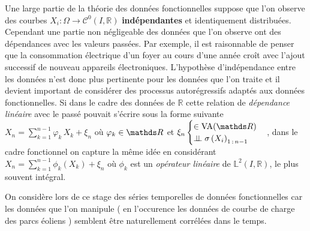 Une large partie de la théorie des données fonctionnelles suppose que l'on observe des courbes $X_i : \Omega \rightarrow \mathcal C^0(I, \mathds R)$ \textbf{indépendantes} et identiquement distribuées. Cependant une partie non négligeable des données que l'on observe ont des dépendances avec les valeurs passées. Par exemple, il est raisonnable de penser que la consommation électrique d'un foyer au cours d'une année croît avec l'ajout successif de nouveau appareils électroniques. L'hypothèse d'indépendance entre les données n'est donc plus pertinente pour les données que l'on traite et il devient important de considérer des processus autorégressifs adaptés aux données fonctionnelles.
Si dans le cadre des données de $\mathds R$ cette relation de \emph{dépendance linéaire} avec le passé pouvait s'écrire sous la forme suivante
$X_n = \sum\limits_{k=1}^{n-1} \varphi_k \, X_k + \xi_n$ où $\varphi_k \in \grandR$
et
$\xi_n \begin{cases} \in \operatorname{VA}(\grandR) \\ \indep \sigma\left( X_i \right)_{1\,: \, n-1}\end{cases}$,
dans le cadre fonctionnel on capture la même idée en considérant
$X_n = \sum\limits_{k=1}^{n-1} \phi_k \left( X_k \right) + \xi_n$ où $\phi_k$
est un \emph{opérateur linéaire} de $\mathds L^2(I, \mathds R)$,
le plus souvent intégral.


On considère lors de ce stage des séries temporelles de données fonctionnelles car les données que l'on manipule ( en l'occurence les données de courbe de charge des parcs éoliens ) semblent être naturellement corrélées dans le temps.



